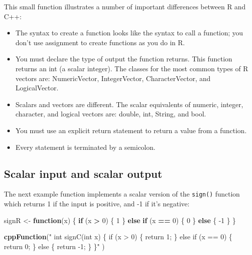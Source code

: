 \documentclass[
]{krantz}
\newenvironment{Shaded}{\begin{snugshade}}{\end{snugshade}}
\newcommand{\ControlFlowTok}[1]{\textcolor[rgb]{0.13,0.29,0.53}{\textbf{#1}}}
\newcommand{\DecValTok}[1]{\textcolor[rgb]{0.00,0.00,0.81}{#1}}
\newcommand{\KeywordTok}[1]{\textcolor[rgb]{0.13,0.29,0.53}{\textbf{#1}}}
\newcommand{\NormalTok}[1]{#1}
\newcommand{\OperatorTok}[1]{\textcolor[rgb]{0.81,0.36,0.00}{\textbf{#1}}}
\newcommand{\StringTok}[1]{\textcolor[rgb]{0.31,0.60,0.02}{#1}}
\providecommand{\tightlist}{%
  \setlength{\itemsep}{0pt}\setlength{\parskip}{0pt}}
\begin{document}
This small function illustrates a number of important differences between R and C++:

\begin{itemize}
\tightlist
\item
  The syntax to create a function looks like the syntax to call a function; you don't use assignment to create functions as you do in R.
\item
  You must declare the type of output the function returns. This function returns an int (a scalar integer). The classes for the most common types of R vectors are: NumericVector, IntegerVector, CharacterVector, and LogicalVector.
\item
  Scalars and vectors are different. The scalar equivalents of numeric, integer, character, and logical vectors are: double, int, String, and bool.
\item
  You must use an explicit return statement to return a value from a function.
\item
  Every statement is terminated by a semicolon.
\end{itemize}

\hypertarget{scalar-input-and-scalar-output}{%
\subsection{Scalar input and scalar output}\label{scalar-input-and-scalar-output}}

The next example function implements a scalar version of the \texttt{sign()} function which returns 1 if the input is positive, and -1 if it's negative:

\begin{Shaded}
\begin{Highlighting}[]
\NormalTok{signR \textless{}{-}}\StringTok{ }\ControlFlowTok{function}\NormalTok{(x) \{}
    \ControlFlowTok{if}\NormalTok{ (x }\OperatorTok{\textgreater{}}\StringTok{ }\DecValTok{0}\NormalTok{) \{}
        \DecValTok{1}
\NormalTok{    \} }\ControlFlowTok{else} \ControlFlowTok{if}\NormalTok{ (x }\OperatorTok{==}\StringTok{ }\DecValTok{0}\NormalTok{) \{}
        \DecValTok{0}
\NormalTok{    \} }\ControlFlowTok{else}\NormalTok{ \{}
        \DecValTok{{-}1}
\NormalTok{    \}}
\NormalTok{\}}

\KeywordTok{cppFunction}\NormalTok{(}\StringTok{"}
\StringTok{  int signC(int x) \{}
\StringTok{    if (x \textgreater{} 0) \{}
\StringTok{      return 1;}
\StringTok{    \} else if (x == 0) \{}
\StringTok{      return 0;}
\StringTok{    \} else \{}
\StringTok{      return {-}1;}
\StringTok{    \}}
\StringTok{  \}"}
\NormalTok{)}
\end{Highlighting}
\end{Shaded}
\end{document}
